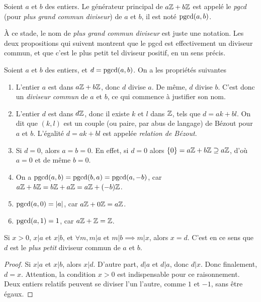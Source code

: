 \begin{definition}
Soient $a$ et $b$ des entiers. Le générateur principal de $a\mathbb{Z}+b\mathbb{Z}$ est appelé le \emph{pgcd} (pour \emph{plus grand commun diviseur}) de $a$ et $b$, il est noté $\operatorname{pgcd}(a,b)$.
\end{definition}

\begin{remarque}
À ce stade, le nom de \emph{plus grand commun diviseur} est juste une notation. Les deux propositions qui suivent montrent que le pgcd est effectivement un diviseur commun, et que c'est le plus petit tel diviseur positif, en un sens précis.
\end{remarque}

\begin{proposition}
Soient $a$ et $b$ des entiers, et $d=\operatorname{pgcd}(a,b)$.
On a les propriétés suivantes
\begin{enumerate}
\item L'entier $a$ est dans $a\mathbb{Z}+b\mathbb{Z}$, donc $d$ divise $a$. De même, $d$ divise $b$. C'est donc un \emph{diviseur commun} de $a$ et $b$, ce qui commence à justifier son nom.
\item L'entier $d$ est dans $d\mathbb{Z}$, donc il existe $k$ et $l$ dans $\mathbb{Z}$, tels que $d = ak+bl$. On dit que $(k,l)$ est un couple (ou paire, par abus de langage) de Bézout pour $a$ et $b$. L'égalité $d=ak+bl$ est appelée \emph{relation de Bézout}.
\item Si $d=0$, alors $a=b=0$. En effet, si $d=0$ alors $\{0\}=a\mathbb{Z}+b\mathbb{Z}\supseteq a\mathbb{Z}$, d'où $a=0$ et de même $b=0$.
\item On a $\operatorname{pgcd}(a,b)=\operatorname{pgcd}(b,a) = \operatorname{pgcd}(a,-b)$, car $a\mathbb{Z}+b\mathbb{Z} = b\mathbb{Z}+a\mathbb{Z}=a\mathbb{Z}+(-b)\mathbb{Z}$.
\item $\operatorname{pgcd}(a,0)=|a|$, car $a\mathbb{Z}+0\mathbb{Z} = a\mathbb{Z}$.
\item $\operatorname{pgcd}(a,1)=1$, car $a\mathbb{Z}+\mathbb{Z} = \mathbb{Z}$.
\end{enumerate}
\end{proposition}

\begin{proposition}
Si $x>0$, $x|a$ et $x|b$, et $\forall m, m|a \text{ et } m|b \implies m|x$, alors $x=d$. C'est en ce sens que $d$ est le \emph{plus petit} diviseur commun de $a$ et $b$.
\end{proposition}
\begin{proof}
Si $x|a$ et $x|b$, alors $x|d$. D'autre part, $d|a$ et $d|a$, donc $d|x$. Donc finalement, $d=x$.
Attention, la condition $x>0$ est indispensable pour ce raisonnement. Deux entiers relatifs peuvent se diviser l'un l'autre, comme $1$ et $-1$, sans être égaux.
\end{proof}

